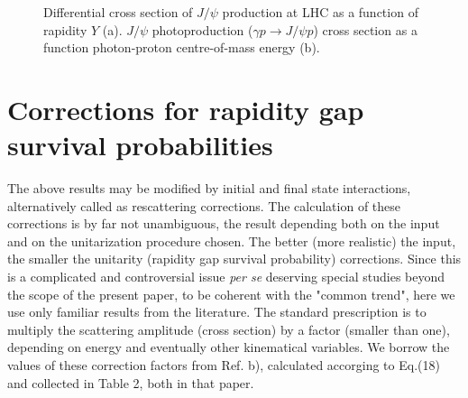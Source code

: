 \documentclass[12pt]{article}
\begin{document}
\begin{figure}[!h]
  \centering
  \caption{Differential cross section  of $J/\psi$ production  at LHC as a function of rapidity $Y$ (a). $J/\psi$ photoproduction ($\gamma p \to J/\psi p$) cross section as a function photon-proton centre-of-mass energy (b).}
\end{figure}

\section{Corrections for rapidity gap survival probabilities}\label{corrections}
The above results may be modified by initial and final state interactions,
alternatively called as rescattering corrections. The calculation of these
corrections is by far not unambiguous, the result depending both on the input 
and on the unitarization procedure chosen. The better (more realistic) the input, the smaller the unitarity (rapidity gap survival probability) corrections. 
Since this is a complicated and controversial issue {\it per se} deserving special studies beyond the scope of the present paper, to be coherent with the "common trend", here we use only familiar results from the literature. The standard prescription is to multiply the scattering amplitude (cross section) by a factor (smaller than one), depending on energy and eventually other kinematical variables. 
We borrow the values of these correction factors from Ref.\cite{Ryskin} b), calculated accorging to Eq.(18) and collected in Table 2, both in that paper.
\end{document}
